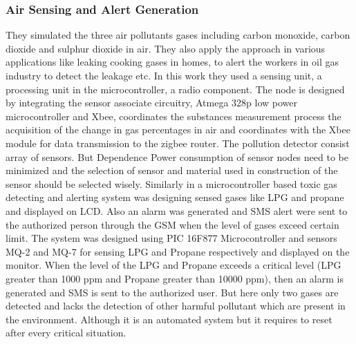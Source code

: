 \subsubsection{Air Sensing and Alert Generation \cite{20}}
They simulated the three air pollutants gases including carbon monoxide, carbon dioxide and sulphur dioxide in air. They also apply the approach in various applications like leaking cooking gases in homes, to alert the workers in oil gas industry to detect the leakage etc. In this work they used a sensing unit, a processing unit in the microcontroller, a radio component. The node is designed by integrating the sensor associate circuitry, Atmega 328p low power microcontroller and Xbee, coordinates the substances measurement process the acquisition of the change in gas percentages in air and coordinates with the Xbee module for data transmission to the zigbee router. The pollution detector consist array of sensors. But Dependence Power consumption of sensor nodes need to be minimized and the selection of sensor and material used in construction of the sensor should be selected wisely. Similarly in a microcontroller based toxic gas detecting and alerting system was designing sensed gases like LPG and propane and displayed on LCD. Also an alarm was generated and SMS alert were sent to the authorized person through the GSM when the level of gases exceed certain limit. The system was designed using PIC 16F877 Microcontroller and sensors MQ-2 and MQ-7 for sensing LPG and Propane respectively and displayed on the monitor. When the level of the LPG and Propane exceeds a critical level (LPG greater than 1000 ppm and Propane greater than 10000 ppm), then an alarm is generated and SMS is sent to the authorized user. But here only two gases are detected and lacks the detection of other harmful pollutant which are present in the environment. Although it is an automated system but it requires to reset after every critical situation.

